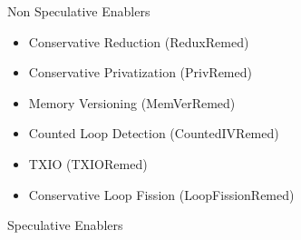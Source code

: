 Non Speculative Enablers

\begin{itemize}
    \item Conservative Reduction (ReduxRemed)

    \item Conservative Privatization (PrivRemed)

    \item Memory Versioning (MemVerRemed)

    \item Counted Loop Detection (CountedIVRemed)

    \item TXIO (TXIORemed)

    \item Conservative Loop Fission (LoopFissionRemed)
\end{itemize}

Speculative Enablers

